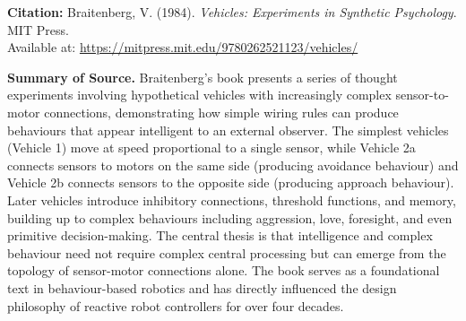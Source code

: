 \documentclass[12pt, a4paper]{article}
\begin{document}
\textbf{Citation:} Braitenberg, V. (1984). \textit{Vehicles: Experiments in Synthetic Psychology}. MIT Press.\\
Available at: \url{https://mitpress.mit.edu/9780262521123/vehicles/}

\vspace{0.6cm}

\textbf{Summary of Source.} Braitenberg's book presents a series of thought experiments involving hypothetical vehicles with increasingly complex sensor-to-motor connections, demonstrating how simple wiring rules can produce behaviours that appear intelligent to an external observer. The simplest vehicles (Vehicle 1) move at speed proportional to a single sensor, while Vehicle 2a connects sensors to motors on the same side (producing avoidance behaviour) and Vehicle 2b connects sensors to the opposite side (producing approach behaviour). Later vehicles introduce inhibitory connections, threshold functions, and memory, building up to complex behaviours including aggression, love, foresight, and even primitive decision-making. The central thesis is that intelligence and complex behaviour need not require complex central processing but can emerge from the topology of sensor-motor connections alone. The book serves as a foundational text in behaviour-based robotics and has directly influenced the design philosophy of reactive robot controllers for over four decades.

\vspace{0.6cm}
\end{document}
